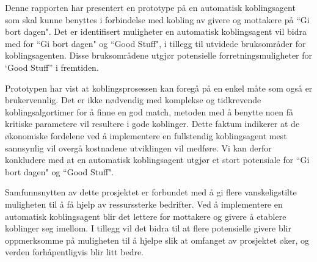 Denne rapporten har presentert en prototype på en automatisk koblingsagent som skal kunne benyttes i forbindelse med kobling av givere og mottakere på ``Gi bort dagen". Det er identifisert muligheter en automatisk koblingsagent vil bidra med for ``Gi bort dagen" og ``Good Stuff", i tillegg til utvidede bruksområder for koblingsagenten. Disse bruksområdene utgjør potensielle forretningsmuligheter for `Good Stuff” i fremtiden.

Prototypen har vist at koblingsprosessen kan foregå på en enkel måte som også er brukervennlig. Det er ikke nødvendig med komplekse og tidkrevende koblingsalgortimer for å finne en god match, metoden med å benytte noen få kritiske parametere vil resultere i gode koblinger. Dette faktum indikerer at de økonomiske fordelene ved å implementere en fullstendig koblingsagent mest sannsynlig vil overgå kostnadene utviklingen vil medføre. Vi kan derfor konkludere med at en automatisk koblingsagent utgjør et stort potensiale for ``Gi bort dagen" og ``Good Stuff". 

Samfunnsnytten av dette prosjektet er forbundet med å gi flere vanskeligstilte muligheten til å få hjelp av ressurssterke bedrifter. Ved å implementere en automatisk koblingsagent blir det lettere for mottakere og givere å etablere koblinger seg imellom. I tillegg vil det bidra til at flere potensielle givere blir oppmerksomme på muligheten til å hjelpe slik at omfanget av prosjektet øker, og verden forhåpentligvis blir litt bedre. 
